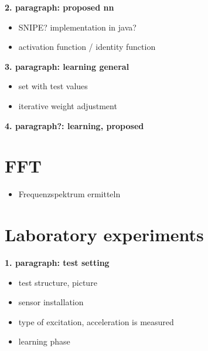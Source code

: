 \documentclass[12pt]{scrartcl}
\begin{document}

\textbf{2. paragraph: proposed nn}

\begin{itemize}
\item SNIPE? implementation in java?
\item activation function / identity function
\end{itemize}

\textbf{3. paragraph: learning general}

\begin{itemize}
\item set with test values
\item iterative weight adjustment
\end{itemize}

\textbf{4. paragraph?: learning, proposed}


\section*{FFT}

\begin{itemize}
\item Frequenzspektrum ermitteln
\end{itemize}


\newpage
\section*{Laboratory experiments}

\textbf{1. paragraph: test setting}

\begin{itemize}
\item test structure, picture
\item sensor installation
\item type of excitation, acceleration is measured

\item learning phase
\end{itemize}
\end{document}
